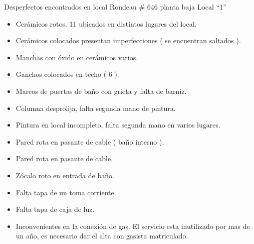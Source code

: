 Desperfectos encontrados en local Rondeau \# 646 planta baja Local ``1''

\begin{itemize}
\tightlist
\item
  Cerámicos rotos. 11 ubicados en distintos lugares del local.
\item
  Cerámicos colocados presentan imperfecciones ( se encuentran saltados
  ).
\item
  Manchas con óxido en cerámicos varios.
\item
  Ganchos colocados en techo ( 6 ).
\item
  Marcos de puertas de baño con grieta y falta de barniz.
\item
  Columna desprolija, falta segunda mano de pintura.
\item
  Pintura en local incompleto, falta segunda mano en varios lugares.
\item
  Pared rota en pasante de cable ( baño interno ).
\item
  Pared rota en pasante de cable.
\item
  Zócalo roto en entrada de baño.
\item
  Falta tapa de un toma corriente.
\item
  Falta tapa de caja de luz. 
\item
  Inconvenientes en la conexión de gas. El servicio esta inutilizado por
  mas de un año, es necesario dar el alta con gasista matriculado.
\end{itemize}
